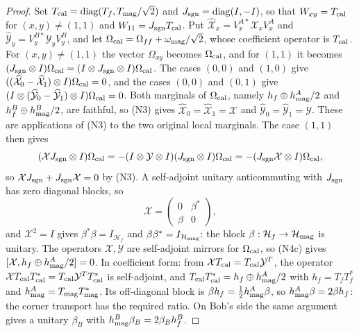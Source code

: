 \begin{proof}
Set $T_{\rm cal}=\operatorname{diag}(T_f,T_{\rm mag}/\sqrt2)$ and ${J_{\rm sgn}}=\operatorname{diag}(I,-I)$, so that $W_{xy}=T_{\rm cal}$ for $(x,y)\ne(1,1)$ and $W_{11}={J_{\rm sgn}}T_{\rm cal}$. Put $\widehat{\mathcal X}_x=V^{A*}_x\mathcal X_xV^A_x$ and $\widehat{\mathcal Y}_y=V^{B*}_y\mathcal Y_yV^B_y$, and let $\Omega_{\rm cal}=\Omega_{ff}+\omega_{\rm mag}/\sqrt2$, whose coefficient operator is $T_{\rm cal}$. For $(x,y)\ne(1,1)$ the vector $\Omega_{xy}$ becomes $\Omega_{\rm cal}$, and for $(1,1)$ it becomes $({J_{\rm sgn}}\otimes I)\Omega_{\rm cal}=(I\otimes{J_{\rm sgn}}\otimes I)\Omega_{\rm cal}$. The cases $(0,0)$ and $(1,0)$ give $((\widehat{\mathcal X}_0-\widehat{\mathcal X}_1)\otimes I)\Omega_{\rm cal}=0$, and the cases $(0,0)$ and $(0,1)$ give $(I\otimes(\widehat{\mathcal Y}_0-\widehat{\mathcal Y}_1)\otimes I)\Omega_{\rm cal}=0$. Both marginals of $\Omega_{\rm cal}$, namely $h_f\oplus h^A_{\rm mag}/2$ and $h^B_f\oplus h^B_{\rm mag}/2$, are faithful, so (N3) gives $\widehat{\mathcal X}_0=\widehat{\mathcal X}_1=\mathcal X$ and $\widehat{\mathcal Y}_0=\widehat{\mathcal Y}_1=\mathcal Y$. These are applications of (N3) to the two original local marginals. The case $(1,1)$ then gives
\[
 (\mathcal X{J_{\rm sgn}}\otimes I)\Omega_{\rm cal}=-(I\otimes\mathcal Y\otimes I)({J_{\rm sgn}}\otimes I)\Omega_{\rm cal}
 =-({J_{\rm sgn}}\mathcal X\otimes I)\Omega_{\rm cal},
\]
so $\mathcal X{J_{\rm sgn}}+{J_{\rm sgn}}\mathcal X=0$ by (N3). A self-adjoint unitary anticommuting with ${J_{\rm sgn}}$ has zero diagonal blocks, so
\[
 \mathcal X=\begin{pmatrix}0&\beta^*\\\beta&0\end{pmatrix},
\]
and $\mathcal X^2=I$ gives $\beta^*\beta=I_{\mathcal H_f}$ and $\beta\beta^*=I_{\mathcal H_{\rm mag}}$: the block $\beta:\mathcal H_f\to\mathcal H_{\rm mag}$ is unitary. The operators $\mathcal X,\mathcal Y$ are self-adjoint mirrors for $\Omega_{\rm cal}$, so (N4c) gives $[\mathcal X,h_f\oplus h^A_{\rm mag}/2]=0$. In coefficient form: from $\mathcal XT_{\rm cal}=T_{\rm cal}\mathcal Y^T$, the operator $\mathcal XT_{\rm cal}T_{\rm cal}^*=T_{\rm cal}\mathcal Y^TT_{\rm cal}^*$ is self-adjoint, and $T_{\rm cal}T_{\rm cal}^*=h_f\oplus h^A_{\rm mag}/2$ with $h_f=T_fT_f^*$ and $h^A_{\rm mag}=T_{\rm mag}T_{\rm mag}^*$. Its off-diagonal block is $\beta h_f=\tfrac12h^A_{\rm mag}\beta$, so $h^A_{\rm mag}\beta=2\beta h_f$: the corner transport has the required ratio. On Bob's side the same argument gives a unitary $\beta_B$ with $h^B_{\rm mag}\beta_B=2\beta_Bh^B_f$.


\end{proof}
